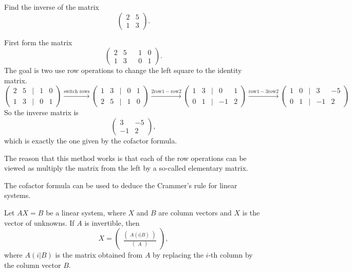 \begin{example}
  Find the inverse of the matrix
  \[
    \begin{pmatrix}
    2 & 5 \\
    1 & 3
  \end{pmatrix}.
  \]
\end{example}
\begin{solution}
  First form the matrix 
  \[
    \begin{pmatrix}
      2 & 5 &  & 1 & 0\\
      1 & 3 &  & 0 & 1
    \end{pmatrix}.
  \]
  The goal is two use row operations to change the left square to the identity matrix.
  \[
    \begin{pmatrix}
      2 & 5 & | & 1 & 0\\
      1 & 3 & | & 0 & 1
    \end{pmatrix}
    \overset{\text{switch rows}}{\rightarrow} \begin{pmatrix}
      1 & 3 & | & 0 & 1\\
      2 & 5 & | & 1 & 0
    \end{pmatrix}
    \overset{2\text{row} 1 - \text{row} 2}{\rightarrow} \begin{pmatrix}
      1 & 3 & | & 0 & 1\\
      0 & 1 & | & -1 & 2
    \end{pmatrix}
    \overset{\text{row} 1 - 3\text{row} 2}{\rightarrow} \begin{pmatrix}
      1 & 0 & | & 3 & -5\\
      0 & 1 & | & -1 & 2
    \end{pmatrix}
  \]
So the inverse matrix is
\[\begin{pmatrix}
  3 & -5\\
  -1 & 2
\end{pmatrix},\]
which is exactly the one given by the cofactor formula.
\end{solution}

The reason that this method works is that each of the row operations can be viewed as multiply the matrix from the left by a so-called elementary matrix.

The cofactor formula can be used to deduce the Crammer's rule for linear systems.

\begin{theorem}
  Let $AX=B$ be a linear system, where $X$ and $B$ are column vectors and $X$ is the vector of unknowns. If $A$ is invertible, then
  \[X=\begin{pmatrix}
    \frac{\begin{pmatrix}
      A(i|B)
    \end{pmatrix}}{\begin{pmatrix}
      A
    \end{pmatrix}}
  \end{pmatrix},
  \]
  where $A(i|B)$ is the matrix obtained from $A$ by replacing the $i$-th column by the column vector $B$.
\end{theorem}

